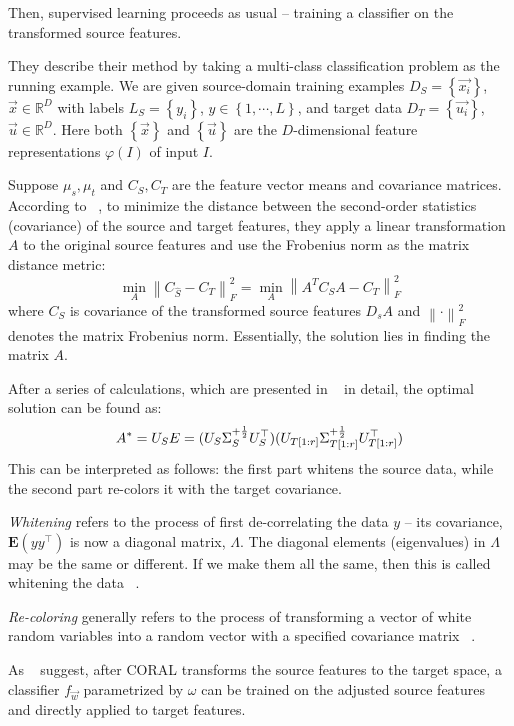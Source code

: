 Then, supervised learning proceeds as usual -- training a classifier on the transformed source features.

They describe their method by taking a multi-class classification problem as the running example. We are given source-domain training examples $D_S = \left \{ \overrightarrow{x_i} \right \}$, $\overrightarrow{x} \in \mathbb{R}^{D}$ with labels $L_S = \left \{ y_i \right \}$, $ y \in \left \{ {1, \cdots, L} \right \}$, and target data $D_T = \left \{ \overrightarrow{u_i} \right \}$, $\overrightarrow{u} \in \mathbb{R}^{D}$. Here both $\left \{ \overrightarrow{x} \right \}$ and $\left \{ \overrightarrow{u} \right \}$ are the $D$-dimensional feature representations $\varphi(I)$ of input $I$.

Suppose $\mu_s, \mu_t$ and $C_S, C_T$ are the feature vector means and covariance matrices. According to ~\citep{coral}, to minimize the distance between the second-order statistics (covariance) of the source and target features, they apply a linear transformation $A$ to the original source features and use the Frobenius norm as the matrix distance metric: \[ \min_{A} \left \| C_{\hat{S}} - C_T \right \| _{F}^{2} = \min_{A} \left \| A^{T}C_{S}A - C_T \right \| _{F}^{2} \] where $C_S$ is covariance of the transformed source features $D_{s}A$ and $\left \| \cdot   \right \| _{F}^{2}$ denotes the matrix Frobenius norm. Essentially, the solution lies in finding the matrix $A$.

After a series of calculations, which are presented in ~\citep{coral} in detail, the optimal solution can be found as: \[ A^{*} = U_{S}E \\ = (U_{S}\Sigma_{S}^{+\frac{1}{2}}U_{S}^\top)(U_{T[1:r]}\Sigma_{T[1:r]}^{+\frac{1}{2}}U_{T[1:r]}^\top) \] 
This can be interpreted as follows: the first part whitens the source data, while the second part re-colors it with the target covariance. 

\textit{Whitening} refers to the process of first de-correlating the data $y$ -- its covariance, $\mathbf{E}(yy^\top)$ is now a diagonal matrix, $\Lambda$. The diagonal elements (eigenvalues) in $\Lambda$ may be the same or different. If we make them all the same, then this is called whitening the data ~\citep{rosalind}. 

\textit{Re-coloring} generally refers to the process of transforming a vector of white random variables into a random vector with a specified covariance matrix ~\citep{miliha}.

As ~\citet{coral} suggest, after CORAL transforms the source features to the target space, a classifier $f_{\overrightarrow{w}}$ parametrized by $\omega$ can be trained on the adjusted source features and directly applied to target features. 

